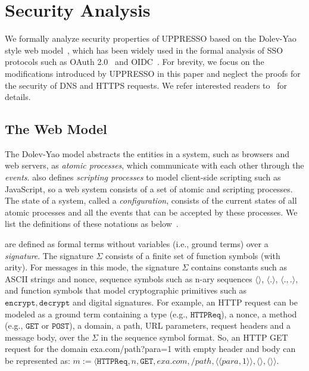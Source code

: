 \section{Security Analysis}
\label{sec:formal}

We  formally analyze  security properties of UPPRESSO based on the Dolev-Yao style web model~\cite{SPRESSO}, which has been widely used in the formal analysis of SSO protocols such as OAuth 2.0~\cite{FettKS16} and OIDC~\cite{FettKS17}. For brevity, we focus on the modifications introduced by UPPRESSO in this paper and neglect the proofs for the security of DNS and HTTPS requests. We refer interested readers to~\cite{SPRESSO} for details.
\subsection{The Web Model}
\label{subsec:webmodel}
The Dolev-Yao model abstracts the entities in a system, such as browsers and web servers, as {\em atomic processes}, which communicate with each other through the {\em events}. \cite{SPRESSO} also defines {\em scripting processes} to model client-side scripting such as JavaScript, so a web system consists of a set of atomic and scripting processes. The state of a system, called a {\em configuration}, consists of the current states of all atomic processes and all the events that can be accepted by these processes. We list the definitions of these notations as below~\cite{SPRESSO}.

 are defined as formal terms without variables (i.e., ground terms) over a {\em signature}. %
The signature $\Sigma$ consists of a finite set of function symbols (with arity). For messages in this mode, the signature $\Sigma$ contains constants such as ASCII strings and nonce, sequence symbols such as n-ary sequences $\langle \rangle$, $\langle . \rangle$, $\langle . ,. \rangle$, and function symbols that model cryptographic primitives such as $\mathtt{encrypt}, \mathtt{decrypt}$ and digital signatures. For example, an HTTP request can be modeled as a ground term containing a type (e.g., $\mathtt{HTTPReq}$), a nonce, a method (e.g., $\mathtt{GET}$ or $\mathtt{POST}$), a domain, a path, URL parameters, request headers and a message body, over the $\Sigma$ in the sequence symbol format. So,
an HTTP GET request for the domain {\sf exa.com/path?para=1} with empty header and body can be represented as: $m:=\langle\mathtt{HTTPReq},n,\mathtt{GET},exa.com,/path,\langle \langle para, 1\rangle \rangle ,\langle \rangle,\langle \rangle \rangle$.

